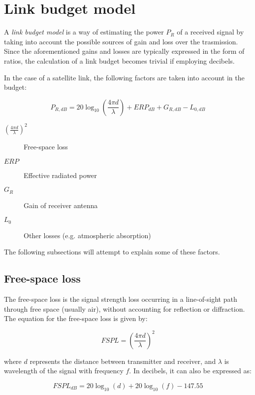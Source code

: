 \section{Link budget model}
A \emph{link budget model} is a way of estimating the power $P_R$ of a received signal by taking into account the possible sources of gain and loss over the trasmission.
Since the aforementioned gains and losses are typically expressed in the form of ratios, the calculation of a link budget becomes trivial if employing decibels.

In the case of a satellite link, the following factors are taken into account in the budget:

\begin{equation}
	P_{R, dB} = 20\log_{10}\left(\frac{4 \pi d}{\lambda}\right) + {ERP}_{dB} + G_{R, dB} - L_{0, dB}
\end{equation}

\begin{description}
	\item[$(\frac{4 \pi d}{\lambda})^2$] Free-space loss
	\item[$ERP$] Effective radiated power
	\item[$G_R$] Gain of receiver antenna
	\item[$L_0$] Other losses (e.g. atmospheric absorption)
\end{description}

The following subsections will attempt to explain some of these factors.

\subsection{Free-space loss}
The free-space loss is the signal strength loss occurring in a line-of-sight path through free space (usually air), without accounting for reflection or diffraction. The equation for the free-space loss is given by:

\begin{equation}
	{FSPL} = \left(\frac{4 \pi d}{\lambda}\right)^2
\end{equation}

where $d$ represents the distance between transmitter and receiver, and $\lambda$ is wavelength of the signal with frequency $f$.
In decibels, it can also be expressed as:

\begin{equation}
	{FSPL}_{dB} = 20\log_{10}(d) + 20\log_{10}(f) - 147.55
\end{equation}

